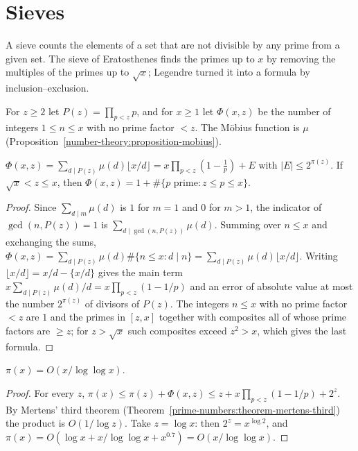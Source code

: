 \section{Sieves}\label{additive-number-theory:section-sieves}

A sieve counts the elements of a set that are not divisible by any prime from a given set. The sieve of Eratosthenes finds the primes up to $x$ by removing the multiples of the primes up to $\sqrt x$;
Legendre turned it into a formula by inclusion--exclusion.

\begin{notation}\label{additive-number-theory:notation-sieve}
For $z \geq 2$ let $P(z) = \prod_{p < z}p$, and for $x \geq 1$ let $\Phi(x, z)$ be the number of integers $1 \leq n \leq x$ with no prime factor $< z$. The M\"obius function is $\mu$
(Proposition~\ref{number-theory:proposition-mobius}).
\end{notation}

\begin{proposition}[Legendre]\label{additive-number-theory:proposition-legendre-sieve}
$\Phi(x, z) = \sum_{d \mid P(z)}\mu(d)\lfloor x/d\rfloor = x\prod_{p < z}(1 - \frac1p) + E$ with $|E| \leq 2^{\pi(z)}$. If $\sqrt x < z \leq x$, then $\Phi(x, z) = 1 + \#\{p \text{ prime} : z \leq p \leq x\}$.
\end{proposition}

\begin{proof}
Since $\sum_{d \mid m}\mu(d)$ is $1$ for $m = 1$ and $0$ for $m > 1$, the indicator of $\gcd(n, P(z)) = 1$ is $\sum_{d \mid \gcd(n, P(z))}\mu(d)$. Summing over $n \leq x$ and exchanging the sums,
$\Phi(x, z) = \sum_{d \mid P(z)}\mu(d)\#\{n \leq x : d \mid n\} = \sum_{d \mid P(z)}\mu(d)\lfloor x/d\rfloor$. Writing $\lfloor x/d\rfloor = x/d - \{x/d\}$ gives the main term
$x\sum_{d \mid P(z)}\mu(d)/d = x\prod_{p < z}(1 - 1/p)$ and an error of absolute value at most the number $2^{\pi(z)}$ of divisors of $P(z)$. The integers $n \leq x$ with no prime factor $< z$ are $1$ and the primes in
$[z, x]$ together with composites all of whose prime factors are $\geq z$; for $z > \sqrt x$ such composites exceed $z^2 > x$, which gives the last formula.
\end{proof}

\begin{corollary}\label{additive-number-theory:corollary-legendre-bound}
$\pi(x) = O(x/\log\log x)$.
\end{corollary}

\begin{proof}
For every $z$, $\pi(x) \leq \pi(z) + \Phi(x, z) \leq z + x\prod_{p < z}(1 - 1/p) + 2^z$. By Mertens' third theorem (Theorem~\ref{prime-numbers:theorem-mertens-third}) the product is $O(1/\log z)$. Take
$z = \log x$: then $2^z = x^{\log 2}$, and $\pi(x) = O(\log x + x/\log\log x + x^{0.7}) = O(x/\log\log x)$.
\end{proof}

